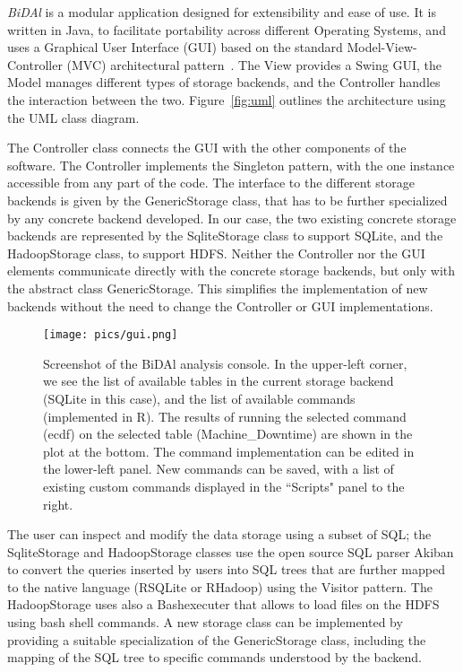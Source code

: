 \documentclass{article}
\begin{document}
\emph{BiDAl} is a modular application designed for extensibility and ease of use. It is written in Java, to facilitate portability across different Operating Systems, and uses a Graphical User Interface (GUI) based on the standard Model-View-Controller (MVC) architectural pattern~\cite{gamma1994}. The View provides a Swing GUI, the Model manages different types of storage backends, and the Controller handles the interaction between the two. Figure~\ref{fig:uml} outlines the architecture using the UML class diagram. 

The Controller class connects the GUI with the other components of the software. The Controller implements the Singleton pattern, with the one instance accessible from any part of the code. The interface to the different storage backends is given by the GenericStorage class, that has to be further specialized by any concrete backend developed. In our case, the two existing concrete storage backends are represented by the SqliteStorage class to support SQLite, and the HadoopStorage class, to support HDFS. Neither the Controller nor the GUI elements communicate directly with the concrete storage backends, but only with the abstract class GenericStorage. This simplifies the implementation of new backends without the need to change the Controller or GUI implementations.


\begin{figure}
\centering
  \texttt{[image: pics/gui.png]}
\caption{Screenshot of the BiDAl analysis console. In the upper-left corner, we see the list of available tables in the current storage backend (SQLite in this case), and the list of available commands (implemented in R).  The results of running the selected command (ecdf) on the selected table (Machine\_Downtime) are shown in the plot at the bottom. The command implementation can be edited in the lower-left panel. New commands can be saved, with a list of existing custom commands displayed in the ``Scripts" panel to the right.}
\label{fig:gui}       
\end{figure}

The user can inspect and modify the data storage using a subset of SQL; the SqliteStorage and HadoopStorage classes use the open source SQL parser Akiban to convert the queries inserted by users into SQL trees that are further mapped to the native language (RSQLite or RHadoop) using the Visitor pattern. The HadoopStorage uses also a Bashexecuter that allows to load files on the HDFS using bash shell commands. A new storage class can be implemented by providing a suitable specialization of the GenericStorage class, including the mapping of the SQL tree to specific commands understood by the backend.
\end{document}
